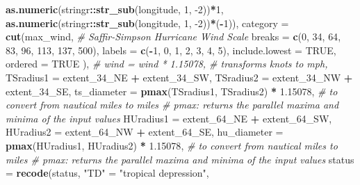 \documentclass[]{book}
\newenvironment{Shaded}{\begin{snugshade}}{\end{snugshade}}
\newcommand{\CommentTok}[1]{\textcolor[rgb]{0.56,0.35,0.01}{\textit{#1}}}
\newcommand{\DataTypeTok}[1]{\textcolor[rgb]{0.13,0.29,0.53}{#1}}
\newcommand{\DecValTok}[1]{\textcolor[rgb]{0.00,0.00,0.81}{#1}}
\newcommand{\FloatTok}[1]{\textcolor[rgb]{0.00,0.00,0.81}{#1}}
\newcommand{\KeywordTok}[1]{\textcolor[rgb]{0.13,0.29,0.53}{\textbf{#1}}}
\newcommand{\NormalTok}[1]{#1}
\newcommand{\OperatorTok}[1]{\textcolor[rgb]{0.81,0.36,0.00}{\textbf{#1}}}
\newcommand{\OtherTok}[1]{\textcolor[rgb]{0.56,0.35,0.01}{#1}}
\newcommand{\StringTok}[1]{\textcolor[rgb]{0.31,0.60,0.02}{#1}}
\begin{document}
\begin{Shaded}
\begin{Highlighting}[]
{{                              \KeywordTok{as.numeric}\NormalTok{(stringr}\OperatorTok{::}\KeywordTok{str_sub}\NormalTok{(longitude, }\DecValTok{1}\NormalTok{, }\DecValTok{-2}\NormalTok{))}\OperatorTok{*}\DecValTok{1}\NormalTok{, }
                              \KeywordTok{as.numeric}\NormalTok{(stringr}\OperatorTok{::}\KeywordTok{str_sub}\NormalTok{(longitude, }\DecValTok{1}\NormalTok{, }\DecValTok{-2}\NormalTok{))}\OperatorTok{*}\NormalTok{(}\OperatorTok{-}\DecValTok{1}\NormalTok{)),}
    \DataTypeTok{category =} \KeywordTok{cut}\NormalTok{(max_wind, }\CommentTok{# Saffir-Simpson Hurricane Wind Scale}
      \DataTypeTok{breaks =} \KeywordTok{c}\NormalTok{(}\DecValTok{0}\NormalTok{, }\DecValTok{34}\NormalTok{, }\DecValTok{64}\NormalTok{, }\DecValTok{83}\NormalTok{, }\DecValTok{96}\NormalTok{, }\DecValTok{113}\NormalTok{, }\DecValTok{137}\NormalTok{, }\DecValTok{500}\NormalTok{),}
      \DataTypeTok{labels =} \KeywordTok{c}\NormalTok{(}\OperatorTok{-}\DecValTok{1}\NormalTok{, }\DecValTok{0}\NormalTok{, }\DecValTok{1}\NormalTok{, }\DecValTok{2}\NormalTok{, }\DecValTok{3}\NormalTok{, }\DecValTok{4}\NormalTok{, }\DecValTok{5}\NormalTok{),}
      \DataTypeTok{include.lowest =} \OtherTok{TRUE}\NormalTok{, }\DataTypeTok{ordered =} \OtherTok{TRUE}
\NormalTok{    ),}
    \CommentTok{# wind = wind * 1.15078, # transforms knots to mph,}
    \DataTypeTok{TSradius1 =}\NormalTok{ extent_}\DecValTok{34}\NormalTok{_NE }\OperatorTok{+}\StringTok{ }\NormalTok{extent_}\DecValTok{34}\NormalTok{_SW,}
    \DataTypeTok{TSradius2 =}\NormalTok{ extent_}\DecValTok{34}\NormalTok{_NW }\OperatorTok{+}\StringTok{ }\NormalTok{extent_}\DecValTok{34}\NormalTok{_SE,}
    \DataTypeTok{ts_diameter =} \KeywordTok{pmax}\NormalTok{(TSradius1, TSradius2) }\OperatorTok{*}\StringTok{ }\FloatTok{1.15078}\NormalTok{, }\CommentTok{# to convert from nautical miles to miles # pmax: returns the parallel maxima and minima of the input values}
    \DataTypeTok{HUradius1 =}\NormalTok{ extent_}\DecValTok{64}\NormalTok{_NE }\OperatorTok{+}\StringTok{ }\NormalTok{extent_}\DecValTok{64}\NormalTok{_SW,}
    \DataTypeTok{HUradius2 =}\NormalTok{ extent_}\DecValTok{64}\NormalTok{_NW }\OperatorTok{+}\StringTok{ }\NormalTok{extent_}\DecValTok{64}\NormalTok{_SE,}
    \DataTypeTok{hu_diameter =} \KeywordTok{pmax}\NormalTok{(HUradius1, HUradius2) }\OperatorTok{*}\StringTok{ }\FloatTok{1.15078}\NormalTok{, }\CommentTok{# to convert from nautical miles to miles # pmax: returns the parallel maxima and minima of the input values}
    \DataTypeTok{status =} \KeywordTok{recode}\NormalTok{(status,}
                    \StringTok{"TD"}\NormalTok{ =}\StringTok{ "tropical depression"}\NormalTok{,}
}}
\end{Highlighting}
\end{Shaded}
\end{document}
